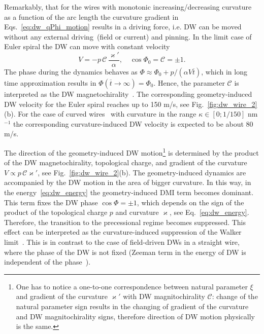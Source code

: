 Remarkably, that for the wires with monotonic increasing/decreasing curvature as a function of the arc length the curvature gradient in Eqs.~\eqref{eq:dw_qPhi_motion} results in a driving force, i.e. DW can be moved without any external driving~(field or current) and pinning. In the limit case of Euler spiral the DW can move with constant velocity
\begin{equation}\label{eq:velocity_euler_spiral}
V=-p\,\mathcal{C}\,\frac{\varkappa'}{\alpha},\quad\cos\Phi_0=\mathcal{C}=\pm1.
\end{equation}
The phase during the dynamics behaves as $\Phi\approx\Phi_0+p/\left(\alpha V \overline{t}\right)$, which in long time approximation results in $\Phi\left(\overline{t}\to\infty\right)=\Phi_0$. Hence, the parameter $\mathcal{C}$ is interpreted as the DW magnetochirality~\cite{Kim14}.  The corresponding geometry-induced DW velocity for the Euler spiral reaches up to 150 m/s, see Fig.~\ref{fig:dw_wire_2}(b). For the case of curved wires~\cite{Lewis09,Nahrwold09,Wartelle18} with curvature in the range $\kappa\in\left[0;1/150\right]$ nm$^{-1}$ the corresponding curvature-induced DW velocity is expected to be about 80 m/s.

The direction of the geometry-induced DW motion\footnote{One has to notice a one-to-one correspondence between natural	parameter $\xi$ and gradient of the curvature $\varkappa'$ with DW magnitochirality $\mathcal{C}$: change of the natural parameter sign results in the changing of gradient of the curvature and DW magnitochirality	signs, therefore direction of DW motion physically is the same.} is determined by the product of the DW magnetochirality, topological charge, and gradient of the curvature $V\propto p\,\mathcal{C}\varkappa'$, see Fig.~\ref{fig:dw_wire_2}(b). The geometry-induced dynamics are accompanied by the DW motion in the area of bigger curvature. In this way, in the energy~\eqref{eq:dw_energy} the geometry-induced DMI term becomes dominant. This term fixes the DW phase $\cos\Phi=\pm1$, which depends on the sign of the product of the topological charge $p$ and curvature $\varkappa$, see Eq.~\eqref{eq:dw_energy}. Therefore, the transition to the precessional regime becomes suppressed. This effect can be interpreted as the curvature-induced suppression of the Walker limit~\cite{Yershov18a}. This is in contrast to the case of field-driven DWs in a straight wire, where the phase of the DW is not fixed (Zeeman term in the energy of DW is independent of the phase~\cite{Malozemoff79,Hillebrands06}).

